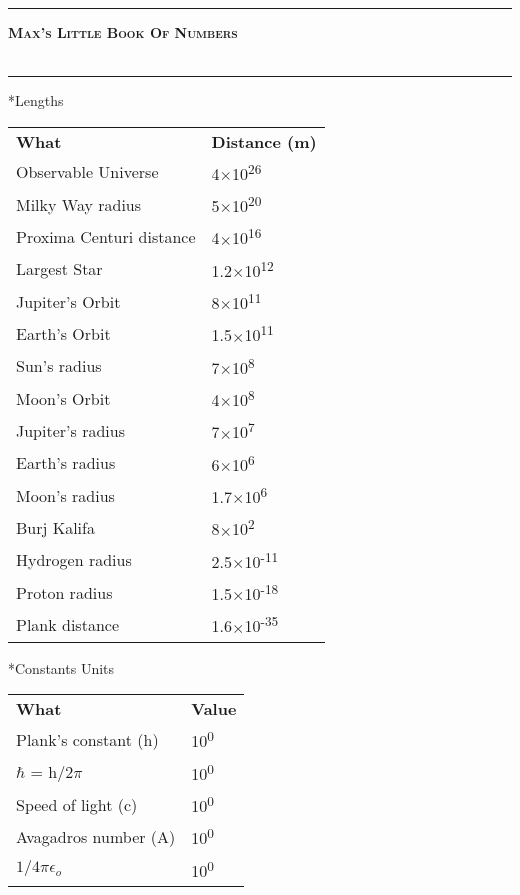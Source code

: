 \documentclass[8pt,a4paper]{extarticle}
\begin{document}
\begin{titlepage}
\begin{center}
\Large
\vspace*{1.0cm}
\hrule\vspace{0.5cm}
{\bf \textsc{Max's Little Book Of Numbers}}\\[1.5cm]
\\[0.5cm]
\hrule
\end{center}
\end{titlepage}
\setcounter{page}{1}


\begin{section}
*{Lengths}
\begin{tabular}{ l l}
\bf{What} & \bf{Distance (m)}\\
Observable Universe & 4$\times$10\textsuperscript{26}\\
Milky Way radius & 5$\times$10\textsuperscript{20}\\
Proxima Centuri distance & 4$\times$10\textsuperscript{16} \\
Largest Star & 1.2$\times$10\textsuperscript{12}\\
Jupiter's Orbit  & 8$\times$10\textsuperscript{11}\\
Earth's Orbit & 1.5$\times$10\textsuperscript{11}\\
Sun's radius & 7$\times$10\textsuperscript{8}\\
Moon's Orbit & 4$\times$10\textsuperscript{8}\\
Jupiter's radius & 7$\times$10\textsuperscript{7}\\
Earth's radius & 6$\times$10\textsuperscript{6}\\
Moon's radius & 1.7$\times$10\textsuperscript{6}\\

Burj Kalifa & 8$\times$10\textsuperscript{2}\\

Hydrogen radius & 2.5$\times$10\textsuperscript{-11}\\
Proton radius & 1.5$\times$10\textsuperscript{-18}\\
Plank distance & 1.6$\times$10\textsuperscript{-35}\\
\end{tabular}
\end{section}

\pagebreak
\begin{section}
*{Constants}
Units
\begin{tabular}{ l l}
\bf{What} & \bf{Value}\\
Plank's constant (h) & 10\textsuperscript{0}\\
$\hbar$ = h/2$\pi$ & 10\textsuperscript{0}\\
Speed of light (c) & 10\textsuperscript{0}\\
Avagadros number (A) & 10\textsuperscript{0}\\
$1/4 \pi\epsilon_o$ & 10\textsuperscript{0}\\

\end{tabular}
\end{section}
\end{document}
